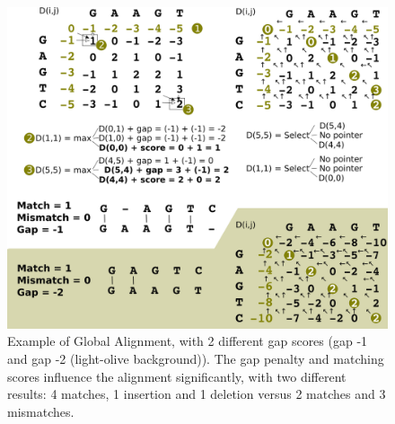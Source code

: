 \begin{figure}[!ht]
\label{fig:global}
    \centering
    \includegraphics[width=1\textwidth]{images/globalAlign.png}
    \caption[Example of Global Alignment]{Example of Global Alignment, with 2 different gap scores (gap -1 and gap -2 (light-olive background)). The gap penalty and matching scores influence the alignment significantly, with two different results: 4 matches, 1 insertion and 1 deletion versus 2 matches and 3 mismatches.}
\end{figure}

